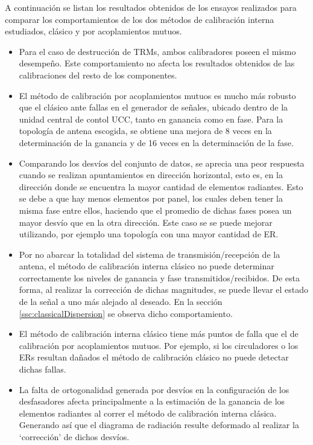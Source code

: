 A continuación se listan los resultados obtenidos de los ensayos realizados para comparar los comportamientos de los dos métodos
de calibración interna estudiados, clásico y por acoplamientos mutuos. 
\begin{itemize}
	\item Para el caso de destrucción de TRMs, ambos calibradores poseen el mismo desempeño. Este comportamiento no afecta los
		resultados obtenidos de las calibraciones del resto de los componentes.
		
	\item El método de calibración por acoplamientos mutuos es mucho más robusto que el clásico ante fallas en el generador de
		señales, ubicado dentro de la unidad central de contol UCC, tanto en ganancia como en fase. Para la topología de antena
		escogida, se obtiene una mejora de 8 veces en la determinación de la ganancia y de 16 veces en la determinación de la
		fase.
	\item Comparando los desvíos del conjunto de datos, se aprecia una peor respuesta cuando se realizan apuntamientos 
		en dirección horizontal, esto es, en la dirección donde se encuentra la mayor cantidad de elementos radiantes. Esto se
		debe a que hay menos elementos por panel, los cuales deben tener la misma fase entre ellos, haciendo que el promedio de
		dichas fases posea un mayor desvío que en la otra dirección. Este caso se se puede mejorar utilizando, por ejemplo una
		topología con una mayor cantidad de ER.
	\item Por no abarcar la totalidad del sistema de transmisión/recepción de la antena, el método de calibración interna clásico
		no puede determinar correctamente los niveles de ganancia y fase transmitidos/recibidos. De esta forma, al realizar la
		corrección de dichas magnitudes, se puede llevar el estado de la señal a uno más alejado al deseado. En la sección
		\ref{ssc:classicalDispersion} se observa dicho comportamiento. 
	\item El método de calibración interna clásico tiene más puntos de falla que el de calibración por acoplamientos mutuos. Por
		ejemplo, si los circuladores o los ERs resultan dañados el método de calibración clásico no puede detectar dichas fallas.
	\item La falta de ortogonalidad generada por desvíos en la configuración de los desfasadores afecta principalmente a la 
		estimación de la ganancia de los elementos radiantes al correr el método de calibración interna clásica. Generando así
		que el diagrama de radiación resulte deformado al realizar la \enquote*{corrección} de dichos desvíos.


\end{itemize}
